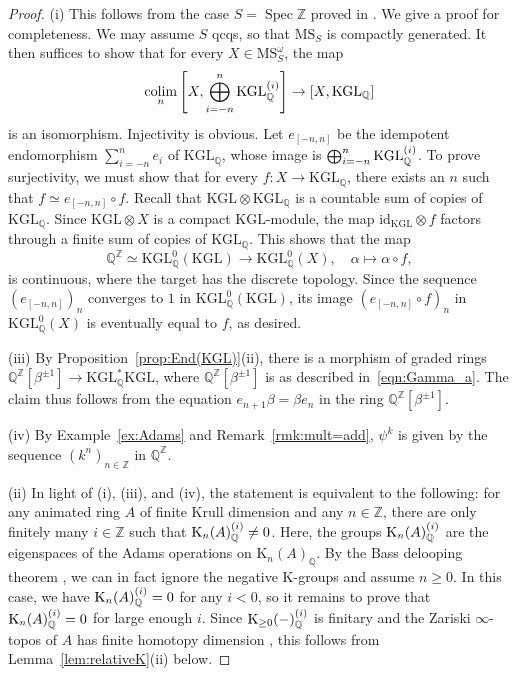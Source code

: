 \documentclass{amsart}
\numberwithin{equation}{section}
\theoremstyle{plain}
\theoremstyle{definition}
\let\bb=\mathbb
\def\Z{\bb Z}
\def\Q{\bb Q}
\def\ph{\mathord-}
\def\id{\mathrm{id}}
\DeclareMathOperator{\Spec}{Spec}
\def\adams#1{{\smash[t]{(#1)}}}
\def\KGL{\mathrm{KGL}}
\def\K{\mathrm{K}{}}
\def\MS{\mathrm{MS}}
\DeclareMathOperator*{\colim}{colim}
\begin{document}
\begin{proof}
	(i) This follows from the case $S=\Spec\Z$ proved in \cite[Theorem 5.3.10]{RiouK}. We give a proof for completeness. We may assume $S$ qcqs, so that $\MS_S$ is compactly generated. It then suffices to show that for every $X\in\MS_S^\omega$, the map
	\[
	\colim_n\left[X,\bigoplus_{i=-n}^n\KGL_\Q^\adams{i}\right] \to [X,\KGL_\Q]
	\]
	is an isomorphism. Injectivity is obvious. Let $e_{[-n,n]}$ be the idempotent endomorphism $\sum_{i=-n}^ne_i$ of $\KGL_\Q$, whose image is $\bigoplus_{i=-n}^n\KGL_\Q^\adams{i}$. To prove surjectivity, we must show that for every $f\colon X\to \KGL_\Q$, there exists an $n$ such that $f\simeq e_{[-n,n]}\circ f$. Recall that $\KGL\otimes\KGL_\Q$ is a countable sum of copies of $\KGL_\Q$. Since $\KGL\otimes X$ is a compact $\KGL$-module, the map $\id_{\KGL}\otimes f$ factors through a finite sum of copies of $\KGL_\Q$. This shows that the map
	\[
	\Q^\Z\simeq \KGL^0_\Q(\KGL) \to \KGL^0_\Q(X),\quad \alpha\mapsto \alpha\circ f,
	\]
	is continuous, where the target has the discrete topology. Since the sequence $(e_{[-n,n]})_n$ converges to $1$ in $\KGL^0_\Q(\KGL)$, its image $(e_{[-n,n]}\circ f)_n$ in $\KGL^0_\Q(X)$ is eventually equal to $f$, as desired.
	
	(iii) By Proposition~\ref{prop:End(KGL)}(ii), there is a morphism of graded rings $\Q^\Z[\beta^{\pm 1}]\to \KGL^*_\Q\KGL$, where $\Q^\Z[\beta^{\pm 1}]$ is as described in~\eqref{eqn:Gamma_a}. The claim thus follows from the equation $e_{n+1}\beta=\beta e_n$ in the ring $\Q^\Z[\beta^{\pm 1}]$.
	
	(iv) By Example~\ref{ex:Adams} and Remark~\ref{rmk:mult=add}, $\psi^k$ is given by the sequence $(k^n)_{n\in\Z}$ in $\Q^\Z$.
	
	(ii) In light of (i), (iii), and (iv), the statement is equivalent to the following: for any animated ring $A$ of finite Krull dimension and any $n\in \Z$, there are only finitely many $i\in\Z$ such that $\K_n(A)_\Q^{\smash[t]{(i)}}\neq 0$. Here, the groups $\K_n(A)_\Q^{\smash[t]{(i)}}$ are the eigenspaces of the Adams operations on $\K_n(A)_\Q$. By the Bass delooping theorem \cite[Corollary 4.13]{AHI}, we can in fact ignore the negative K-groups and assume $n\geq 0$.
	In this case, we have $\K_n(A)_\Q^\adams{i}=0$ for any $i<0$, so it remains to prove that $\K_n(A)_\Q^\adams{i}=0$ for large enough $i$.
	Since $\K_{\geq 0}(\ph)_\Q^\adams{i}$ is finitary and the Zariski $\infty$-topos of $A$ has finite homotopy dimension \cite[Theorem 3.12]{ClausenMathew}, 
	this follows from Lemma~\ref{lem:relativeK}(ii) below.
\end{proof}	
\end{document}
